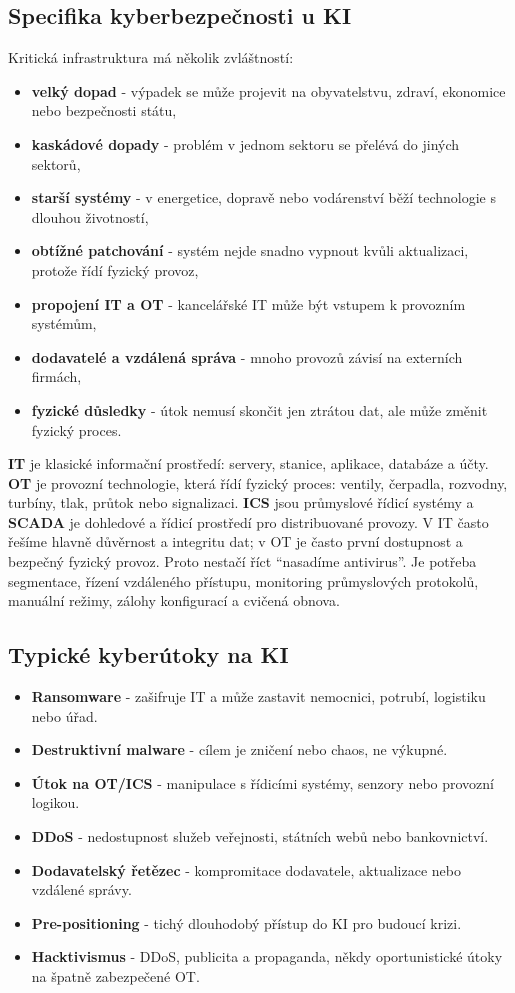 \documentclass[11pt,a4paper]{article}
\begin{document}
\subsection*{Specifika kyberbezpečnosti u KI}
Kritická infrastruktura má několik zvláštností:
\begin{itemize}
  \item \textbf{velký dopad} - výpadek se může projevit na obyvatelstvu, zdraví, ekonomice nebo bezpečnosti státu,
  \item \textbf{kaskádové dopady} - problém v jednom sektoru se přelévá do jiných sektorů,
  \item \textbf{starší systémy} - v energetice, dopravě nebo vodárenství běží technologie s dlouhou životností,
  \item \textbf{obtížné patchování} - systém nejde snadno vypnout kvůli aktualizaci, protože řídí fyzický provoz,
  \item \textbf{propojení IT a OT} - kancelářské IT může být vstupem k provozním systémům,
  \item \textbf{dodavatelé a vzdálená správa} - mnoho provozů závisí na externích firmách,
  \item \textbf{fyzické důsledky} - útok nemusí skončit jen ztrátou dat, ale může změnit fyzický proces.
\end{itemize}

\textbf{IT} je klasické informační prostředí: servery, stanice, aplikace, databáze a účty. \textbf{OT} je provozní technologie, která řídí fyzický proces: ventily, čerpadla, rozvodny, turbíny, tlak, průtok nebo signalizaci. \textbf{ICS} jsou průmyslové řídicí systémy a \textbf{SCADA} je dohledové a řídicí prostředí pro distribuované provozy. V IT často řešíme hlavně důvěrnost a integritu dat; v OT je často první dostupnost a bezpečný fyzický provoz. Proto nestačí říct “nasadíme antivirus”. Je potřeba segmentace, řízení vzdáleného přístupu, monitoring průmyslových protokolů, manuální režimy, zálohy konfigurací a cvičená obnova.

\subsection*{Typické kyberútoky na KI}
\begin{itemize}
  \item \textbf{Ransomware} - zašifruje IT a může zastavit nemocnici, potrubí, logistiku nebo úřad.
  \item \textbf{Destruktivní malware} - cílem je zničení nebo chaos, ne výkupné.
  \item \textbf{Útok na OT/ICS} - manipulace s řídicími systémy, senzory nebo provozní logikou.
  \item \textbf{DDoS} - nedostupnost služeb veřejnosti, státních webů nebo bankovnictví.
  \item \textbf{Dodavatelský řetězec} - kompromitace dodavatele, aktualizace nebo vzdálené správy.
  \item \textbf{Pre-positioning} - tichý dlouhodobý přístup do KI pro budoucí krizi.
  \item \textbf{Hacktivismus} - DDoS, publicita a propaganda, někdy oportunistické útoky na špatně zabezpečené OT.
\end{itemize}
\end{document}
